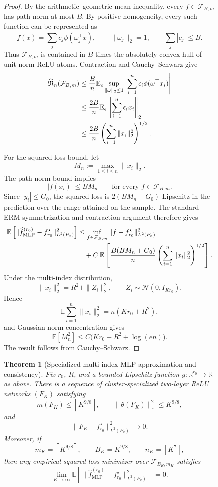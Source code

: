 \documentclass{article}
\newtheorem{theorem}{Theorem}
\begin{document}
\begin{figure}
\begin{proof}
By the arithmetic--geometric mean inequality, every
$f\in\mathcal F_{B,m}$ has path norm at most $B$. By positive homogeneity,
every such function can be represented as
\[
    f(x)=\sum_j c_j\phi(\omega_j^\top x),
    \qquad
    \|\omega_j\|_2=1,
    \qquad
    \sum_j|c_j|\leq B.
\]
Thus $\mathcal F_{B,m}$ is contained in $B$ times the absolutely convex hull
of unit-norm ReLU atoms. Contraction and Cauchy--Schwarz give
\begin{align*}
    \widehat{\mathfrak R}_n(\mathcal F_{B,m})
    &\leq
    {B\over n}\mathbb E_\epsilon
    \sup_{\|\omega\|_2\leq1}
    \left|
        \sum_{i=1}^n\epsilon_i\phi(\omega^\top x_i)
    \right|\\
    &\leq
    {2B\over n}\mathbb E_\epsilon
    \left\|\sum_{i=1}^n\epsilon_i x_i\right\|_2\\
    &\leq
    {2B\over n}
    \left(\sum_{i=1}^n\|x_i\|_2^2\right)^{1/2}.
\end{align*}

For the squared-loss bound, let
\[
    M_n:=\max_{1\leq i\leq n}\|x_i\|_2.
\]
The path-norm bound implies
\[
    |f(x_i)|\leq BM_n
    \qquad\text{for every }f\in\mathcal F_{B,m}.
\]
Since $|y_i|\leq G_0$, the squared loss is
$2(BM_n+G_0)$-Lipschitz in the prediction over the range attained on the
sample. The standard ERM symmetrization and contraction argument therefore
gives
\begin{align*}
    \mathbb E\left[
        \|\widehat f_{\mathrm{MLP}}^{(r_0)}-f_{r_0}^\star
        \|_{L^2(P_x)}^2
    \right]
    &\leq
    \inf_{f\in\mathcal F_{B,m}}
    \|f-f_{r_0}^\star\|_{L^2(P_x)}^2\\
    &\quad+
    C\,\mathbb E\left[
        {B(BM_n+G_0)\over n}
        \left(\sum_{i=1}^n\|x_i\|_2^2\right)^{1/2}
    \right].
\end{align*}
Under the multi-index distribution,
\[
    \|x_i\|_2^2=R^2+\|Z_i\|_2^2,
    \qquad
    Z_i\sim\mathcal N(0,I_{Kr_0}).
\]
Hence
\[
    \mathbb E\sum_{i=1}^n\|x_i\|_2^2=n(Kr_0+R^2),
\]
and Gaussian norm concentration gives
\[
    \mathbb E[M_n^2]
    \leq C\bigl(Kr_0+R^2+\log(en)\bigr).
\]
The result follows from Cauchy--Schwarz.
\end{proof}

\begin{theorem}[Specialized multi-index MLP approximation and consistency]
\label{thm:multi-index-mlp-consistency}
Fix $r_0$, $R$, and a bounded Lipschitz function
$g:\mathbb R^{r_0}\to\mathbb R$ as above. There is a sequence of
cluster-specialized two-layer ReLU networks $(F_K)$ satisfying
\[
    m(F_K)\leq \left\lceil K^{9/8}\right\rceil,
    \qquad
    \|\theta(F_K)\|_{\mathrm F}^2\leq K^{9/8},
\]
and
\[
    \|F_K-f_{r_0}^\star\|_{L^2(P_x)}^2\longrightarrow0.
\]
Moreover, if
\[
    m_K=\left\lceil K^{9/8}\right\rceil,
    \qquad
    B_K=K^{9/8},
    \qquad
    n_K=\left\lceil K^7\right\rceil,
\]
then any empirical squared-loss minimizer over
$\mathcal F_{B_K,m_K}$ satisfies
\[
    \lim_{K\to\infty}
    \mathbb E\left[
        \|\widehat f_{\mathrm{MLP}}^{(r_0)}-f_{r_0}^\star
        \|_{L^2(P_x)}^2
    \right]
    =0.
\]
\end{theorem}


\end{figure}
\end{document}
